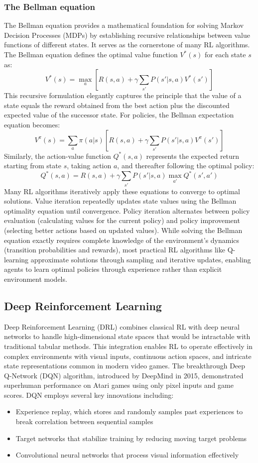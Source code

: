 \subsubsection{The Bellman equation}
The Bellman equation provides a mathematical foundation for solving Markov Decision Processes (MDPs) by establishing recursive relationships between value functions of different states. 
It serves as the cornerstone of many RL algorithms.
The Bellman equation defines the optimal value function $V^*(s)$ for each state $s$ as:
$$V^*(s) = \max_{a} \left[ R(s,a) + \gamma \sum_{s'} P(s'|s,a) V^*(s') \right]$$
This recursive formulation elegantly captures the principle that the value of a state equals the reward obtained from the best action plus the discounted expected value of the successor state. For policies, the Bellman expectation equation becomes:
$$V^{\pi}(s) = \sum_{a} \pi(a|s) \left[ R(s,a) + \gamma \sum_{s'} P(s'|s,a) V^{\pi}(s') \right]$$
Similarly, the action-value function $Q^*(s,a)$ represents the expected return starting from state $s$, taking action $a$, and thereafter following the optimal policy:
$$Q^*(s,a) = R(s,a) + \gamma \sum_{s'} P(s'|s,a) \max_{a'} Q^*(s',a')$$
Many RL algorithms iteratively apply these equations to converge to optimal solutions. Value iteration repeatedly updates state values using the Bellman optimality equation until convergence. Policy iteration alternates between policy evaluation (calculating values for the current policy) and policy improvement (selecting better actions based on updated values).
While solving the Bellman equation exactly requires complete knowledge of the environment's dynamics (transition probabilities and rewards), most practical RL algorithms like Q-learning approximate solutions through sampling and iterative updates, enabling agents to learn optimal policies through experience rather than explicit environment models.

\subsection{Deep Reinforcement Learning}

Deep Reinforcement Learning (DRL) combines classical RL with deep neural networks to handle high-dimensional state spaces that would be intractable with traditional tabular methods. 
This integration enables RL to operate effectively in complex environments with visual inputs, continuous action spaces, and intricate state representations common in modern video games.
The breakthrough Deep Q-Network (DQN) algorithm, introduced by DeepMind in 2015, demonstrated superhuman performance on Atari games using only pixel inputs and game scores. DQN employs several key innovations including:
\begin{itemize}
    \item Experience replay, which stores and randomly samples past experiences to break correlation between sequential samples
    \item Target networks that stabilize training by reducing moving target problems
    \item Convolutional neural networks that process visual information effectively
\end{itemize}

